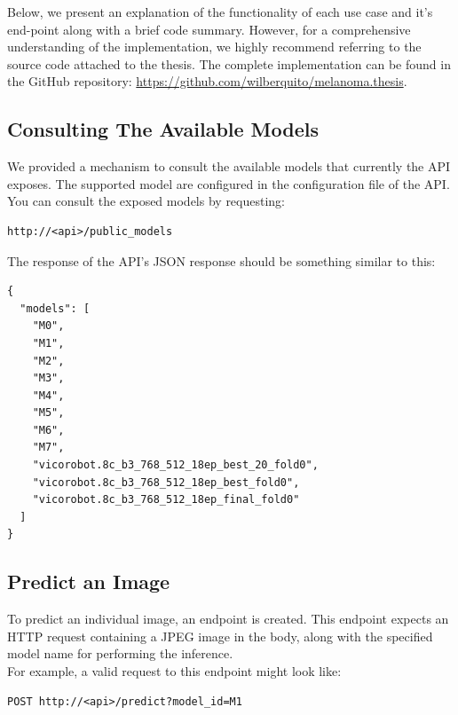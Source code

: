 Below, we present an explanation of the functionality of each use case and it's
end-point along with a brief code summary. However, for a comprehensive
understanding of the implementation, we highly recommend referring to the
source code attached to the thesis. The complete implementation can be found in
the GitHub repository: \url{https://github.com/wilberquito/melanoma.thesis}.

\subsection{Consulting The Available Models}

We provided a mechanism to consult the available models that currently the API
exposes. The supported model are configured in the configuration file of the
API. \\

You can consult the exposed models by requesting:

\begin{Verbatim}[fontsize=\scriptsize]
http://<api>/public_models
\end{Verbatim}

The response of the API's JSON response should be something similar to this:

\begin{Verbatim}[fontsize=\scriptsize]
{
  "models": [
    "M0",
    "M1",
    "M2",
    "M3",
    "M4",
    "M5",
    "M6",
    "M7",
    "vicorobot.8c_b3_768_512_18ep_best_20_fold0",
    "vicorobot.8c_b3_768_512_18ep_best_fold0",
    "vicorobot.8c_b3_768_512_18ep_final_fold0"
  ]
}
\end{Verbatim}



\subsection{Predict an Image}

To predict an individual image, an endpoint is created.
This endpoint expects an HTTP request containing a JPEG image in the body,
along with the specified model name for performing the inference. \\

For example, a valid request to this endpoint might look like:

\begin{Verbatim}[fontsize=\scriptsize]
POST http://<api>/predict?model_id=M1
\end{Verbatim}


